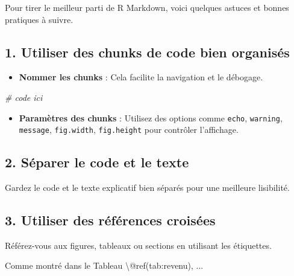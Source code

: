 \documentclass[
]{article}
\newenvironment{Shaded}{\begin{snugshade}}{\end{snugshade}}
\newcommand{\CommentTok}[1]{\textcolor[rgb]{0.56,0.35,0.01}{\textit{#1}}}
\newcommand{\NormalTok}[1]{#1}
\providecommand{\tightlist}{%
  \setlength{\itemsep}{0pt}\setlength{\parskip}{0pt}}
\begin{document}
Pour tirer le meilleur parti de R Markdown, voici quelques astuces et
bonnes pratiques à suivre.

\hypertarget{utiliser-des-chunks-de-code-bien-organisuxe9s}{%
\subsection{1. Utiliser des chunks de code bien
organisés}\label{utiliser-des-chunks-de-code-bien-organisuxe9s}}

\begin{itemize}
\tightlist
\item
  \textbf{Nommer les chunks} : Cela facilite la navigation et le
  débogage.
\end{itemize}

\begin{Shaded}
\begin{Highlighting}[]
  \CommentTok{\# code ici}
\end{Highlighting}
\end{Shaded}

\begin{itemize}
\tightlist
\item
  \textbf{Paramètres des chunks} : Utilisez des options comme
  \texttt{echo}, \texttt{warning}, \texttt{message}, \texttt{fig.width},
  \texttt{fig.height} pour contrôler l'affichage.
\end{itemize}

\hypertarget{suxe9parer-le-code-et-le-texte}{%
\subsection{2. Séparer le code et le
texte}\label{suxe9parer-le-code-et-le-texte}}

Gardez le code et le texte explicatif bien séparés pour une meilleure
lisibilité.

\hypertarget{utiliser-des-ruxe9fuxe9rences-croisuxe9es}{%
\subsection{3. Utiliser des références
croisées}\label{utiliser-des-ruxe9fuxe9rences-croisuxe9es}}

Référez-vous aux figures, tableaux ou sections en utilisant les
étiquettes.

\begin{Shaded}
\begin{Highlighting}[]
\NormalTok{Comme montré dans le Tableau \textbackslash{}@ref(tab:revenu), ...}
\end{Highlighting}
\end{Shaded}
\end{document}
